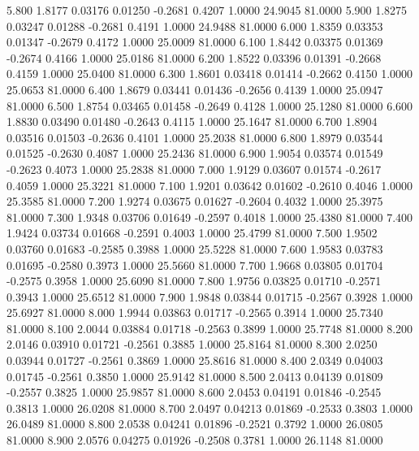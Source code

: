    5.800   1.8177   0.03176   0.01250  -0.2681   0.4207   1.0000  24.9045  81.0000
   5.900   1.8275   0.03247   0.01288  -0.2681   0.4191   1.0000  24.9488  81.0000
   6.000   1.8359   0.03353   0.01347  -0.2679   0.4172   1.0000  25.0009  81.0000
   6.100   1.8442   0.03375   0.01369  -0.2674   0.4166   1.0000  25.0186  81.0000
   6.200   1.8522   0.03396   0.01391  -0.2668   0.4159   1.0000  25.0400  81.0000
   6.300   1.8601   0.03418   0.01414  -0.2662   0.4150   1.0000  25.0653  81.0000
   6.400   1.8679   0.03441   0.01436  -0.2656   0.4139   1.0000  25.0947  81.0000
   6.500   1.8754   0.03465   0.01458  -0.2649   0.4128   1.0000  25.1280  81.0000
   6.600   1.8830   0.03490   0.01480  -0.2643   0.4115   1.0000  25.1647  81.0000
   6.700   1.8904   0.03516   0.01503  -0.2636   0.4101   1.0000  25.2038  81.0000
   6.800   1.8979   0.03544   0.01525  -0.2630   0.4087   1.0000  25.2436  81.0000
   6.900   1.9054   0.03574   0.01549  -0.2623   0.4073   1.0000  25.2838  81.0000
   7.000   1.9129   0.03607   0.01574  -0.2617   0.4059   1.0000  25.3221  81.0000
   7.100   1.9201   0.03642   0.01602  -0.2610   0.4046   1.0000  25.3585  81.0000
   7.200   1.9274   0.03675   0.01627  -0.2604   0.4032   1.0000  25.3975  81.0000
   7.300   1.9348   0.03706   0.01649  -0.2597   0.4018   1.0000  25.4380  81.0000
   7.400   1.9424   0.03734   0.01668  -0.2591   0.4003   1.0000  25.4799  81.0000
   7.500   1.9502   0.03760   0.01683  -0.2585   0.3988   1.0000  25.5228  81.0000
   7.600   1.9583   0.03783   0.01695  -0.2580   0.3973   1.0000  25.5660  81.0000
   7.700   1.9668   0.03805   0.01704  -0.2575   0.3958   1.0000  25.6090  81.0000
   7.800   1.9756   0.03825   0.01710  -0.2571   0.3943   1.0000  25.6512  81.0000
   7.900   1.9848   0.03844   0.01715  -0.2567   0.3928   1.0000  25.6927  81.0000
   8.000   1.9944   0.03863   0.01717  -0.2565   0.3914   1.0000  25.7340  81.0000
   8.100   2.0044   0.03884   0.01718  -0.2563   0.3899   1.0000  25.7748  81.0000
   8.200   2.0146   0.03910   0.01721  -0.2561   0.3885   1.0000  25.8164  81.0000
   8.300   2.0250   0.03944   0.01727  -0.2561   0.3869   1.0000  25.8616  81.0000
   8.400   2.0349   0.04003   0.01745  -0.2561   0.3850   1.0000  25.9142  81.0000
   8.500   2.0413   0.04139   0.01809  -0.2557   0.3825   1.0000  25.9857  81.0000
   8.600   2.0453   0.04191   0.01846  -0.2545   0.3813   1.0000  26.0208  81.0000
   8.700   2.0497   0.04213   0.01869  -0.2533   0.3803   1.0000  26.0489  81.0000
   8.800   2.0538   0.04241   0.01896  -0.2521   0.3792   1.0000  26.0805  81.0000
   8.900   2.0576   0.04275   0.01926  -0.2508   0.3781   1.0000  26.1148  81.0000
